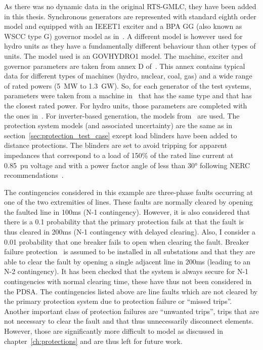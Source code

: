 As there was no dynamic data in the original RTS-GMLC, they have been added in this thesis. Synchronous generators are represented with standard eighth order model and equipped with an IEEET1 exciter and a BPA GG (also known as WSCC type G) governor model as in~\cite{IEEE39Dynamic}. A different model is however used for hydro units as they have a fundamentally different behaviour than other types of units. The model used is an GOVHYDRO1 model. The machine, exciter and governor parameters are taken from annex D of~\cite{vittalBook}. This annex contains typical data for different types of machines (hydro, nuclear, coal, gas) and a wide range of rated powers (5~MW to 1.3~GW). So, for each generator of the test systems, parameters were taken from a machine in~\cite{vittalBook} that has the same type and that has the closest rated power. For hydro units, those parameters are completed with the ones in~\cite{hydroGov}. For inverter-based generation, the models from~\cite{ChaspierreThesis} are used. The protection system models (and associated uncertainty) are the same as in section~\ref{sec:protection_test_case} except load blinders have been added to distance protections. The blinders are set to avoid tripping for apparent impedances that correspond to a load of 150\% of the rated line current at 0.85~pu voltage and with a power factor angle of less than 30° following NERC recommendations~\cite{NERC_load_blinders}.

The contingencies considered in this example are three-phase faults occurring at one of the two extremities of lines. These faults are normally cleared by opening the faulted line in 100ms (N-1 contingency). However, it is also considered that there is a 0.1 probability that the primary protection fails at that the fault is thus cleared in 200ms (N-1 contingency with delayed clearing). Also, I consider a 0.01 probability that one breaker fails to open when clearing the fault. Breaker failure protection~\cite{HorowitzBook} is assumed to be installed in all substations and that they are able to clear the fault by opening a single adjacent line in 200ms (leading to an N-2 contingency). It has been checked that the system is always secure for N-1 contingencies with normal clearing time, these have thus not been considered in the PDSA. The contingencies listed above are line faults which are not cleared by the primary protection system due to protection failure or ``missed trips''. Another important class of protection failures are ``unwanted trips'', \ie trips that are not necessary to clear the fault and that thus unnecessarily disconnect elements. However, those are significantly more difficult to model as discussed in chapter~\ref{ch:protections} and are thus left for future work.

